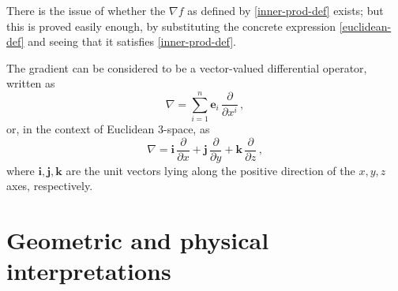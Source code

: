 \documentclass{article}
\newcommand{\vi}{\mathbf{i}}
\newcommand{\vj}{\mathbf{j}}
\newcommand{\vk}{\mathbf{k}}
\newcommand{\ve}{\mathbf{e}}
\begin{document}
There is the issue of whether the $\nabla f$ as defined by \eqref{inner-prod-def}
exists; but this is proved easily enough, by substituting the concrete expression \eqref{euclidean-def}
and seeing that it satisfies \eqref{inner-prod-def}.

\medskip

The gradient can be considered to be a
vector-valued differential operator, written as
\[
\nabla = \sum_{i=1}^n \ve_i \, \frac{\partial}{\partial x^i}\,,
\]
or, in the context of Euclidean 3-space, as
\[
\nabla = \vi \, \frac{\partial}{\partial x} +\vj \,
\frac{\partial}{\partial y} +\vk \, \frac{\partial}{\partial z} \,,
\]
where
$\vi, \vj, \vk$ are the unit vectors lying along the positive
direction of the $x, y, z$ axes, respectively. 

\section{Geometric and physical interpretations}
\end{document}
